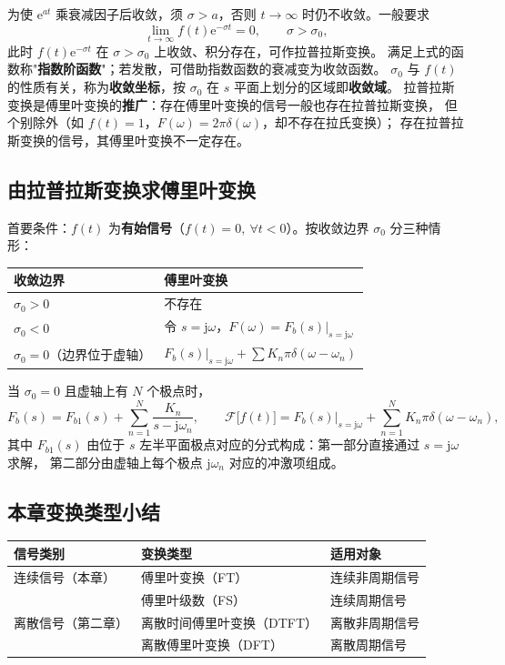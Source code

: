 为使 $\mathrm{e}^{at}$ 乘衰减因子后收敛，须 $\sigma>a$，否则 $t\to\infty$ 时仍不收敛。一般要求
\begin{equation}
\lim_{t\to\infty}f(t)\mathrm{e}^{-\sigma t}=0,\qquad \sigma>\sigma_0,
\end{equation}
此时 $f(t)\mathrm{e}^{-\sigma t}$ 在 $\sigma>\sigma_0$ 上收敛、积分存在，可作拉普拉斯变换。
满足上式的函数称"\textbf{指数阶函数}"；若发散，可借助指数函数的衰减变为收敛函数。
$\sigma_0$ 与 $f(t)$ 的性质有关，称为\textbf{收敛坐标}，按 $\sigma_0$ 在 $s$ 平面上划分的区域即\textbf{收敛域}。
拉普拉斯变换是傅里叶变换的\textbf{推广}：存在傅里叶变换的信号一般也存在拉普拉斯变换，
但个别除外（如 $f(t)=1$，$F(\omega)=2\pi\delta(\omega)$，却不存在拉氏变换）；
存在拉普拉斯变换的信号，其傅里叶变换不一定存在。

\subsection{由拉普拉斯变换求傅里叶变换}

首要条件：$f(t)$ 为\textbf{有始信号}（$f(t)=0,\ \forall t<0$）。按收敛边界 $\sigma_0$ 分三种情形：

\begin{center}
\begin{tabular}{ll}
\toprule
收敛边界 & 傅里叶变换 \\
\midrule
$\sigma_0>0$ & 不存在 \\
$\sigma_0<0$ & 令 $s=\mathrm{j}\omega$，$F(\omega)=F_b(s)|_{s=\mathrm{j}\omega}$ \\
$\sigma_0=0$（边界位于虚轴） & $F_b(s)|_{s=\mathrm{j}\omega}+\sum K_n\pi\delta(\omega-\omega_n)$ \\
\bottomrule
\end{tabular}
\end{center}

当 $\sigma_0=0$ 且虚轴上有 $N$ 个极点时，
\begin{equation}
F_b(s)=F_{b1}(s)+\sum_{n=1}^{N}\frac{K_n}{s-\mathrm{j}\omega_n},
\qquad
\mathcal{F}\big[f(t)\big]=F_b(s)\Big|_{s=\mathrm{j}\omega}+\sum_{n=1}^{N}K_n\pi\delta(\omega-\omega_n),
\end{equation}
其中 $F_{b1}(s)$ 由位于 $s$ 左半平面极点对应的分式构成：第一部分直接通过 $s=\mathrm{j}\omega$ 求解，
第二部分由虚轴上每个极点 $\mathrm{j}\omega_n$ 对应的冲激项组成。

\subsection{本章变换类型小结}

\begin{center}
\begin{tabular}{lll}
\toprule
信号类别 & 变换类型 & 适用对象 \\
\midrule
连续信号（本章） & 傅里叶变换（FT） & 连续非周期信号 \\
 & 傅里叶级数（FS） & 连续周期信号 \\
离散信号（第二章） & 离散时间傅里叶变换（DTFT） & 离散非周期信号 \\
 & 离散傅里叶变换（DFT） & 离散周期信号 \\
\bottomrule
\end{tabular}
\end{center}
